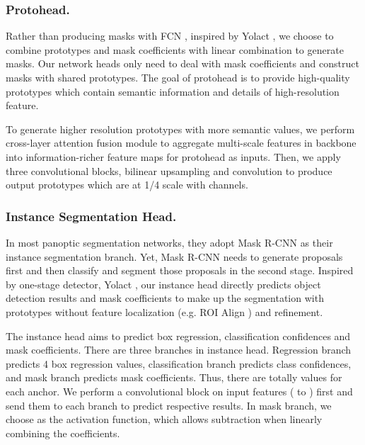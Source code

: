 \documentclass[runningheads]{llncs}
\begin{document}
\subsubsection{Protohead.}
Rather than producing masks with FCN \cite{Long2015}, inspired by Yolact \cite{Bolya}, we choose to combine prototypes and mask coefficients with linear combination to generate masks. Our network heads only need to deal with mask coefficients and construct masks with shared prototypes. The goal of protohead is to provide high-quality prototypes which contain semantic information and details of high-resolution feature.



To generate higher resolution prototypes with more semantic values, we perform cross-layer attention fusion module to aggregate multi-scale features in backbone into information-richer feature maps for protohead as inputs. 
Then, we apply three convolutional blocks,  bilinear upsampling and  convolution to produce output prototypes which are at 1/4 scale with  channels. 






\subsubsection{Instance Segmentation Head.}

In most panoptic segmentation networks, they adopt Mask R-CNN \cite{He2017} as their instance segmentation branch. Yet, Mask R-CNN \cite{He2017} needs to generate proposals first and then classify and segment those proposals in the second stage. Inspired by one-stage detector, Yolact \cite{Bolya}, our instance head directly predicts object detection results and mask coefficients to make up the segmentation with prototypes without feature localization (e.g. ROI Align \cite{He2017}) and refinement.

The instance head aims to predict box regression, classification confidences and mask coefficients. There are three branches in instance head. Regression branch predicts 4 box regression values, classification branch predicts  class confidences, and mask branch predicts  mask coefficients. Thus, there are totally  values for each anchor. We perform a convolutional block on input features ( to ) first and send them to each branch to predict respective results. In mask branch, we choose  as the activation function, which allows subtraction when linearly combining the coefficients.
\end{document}
